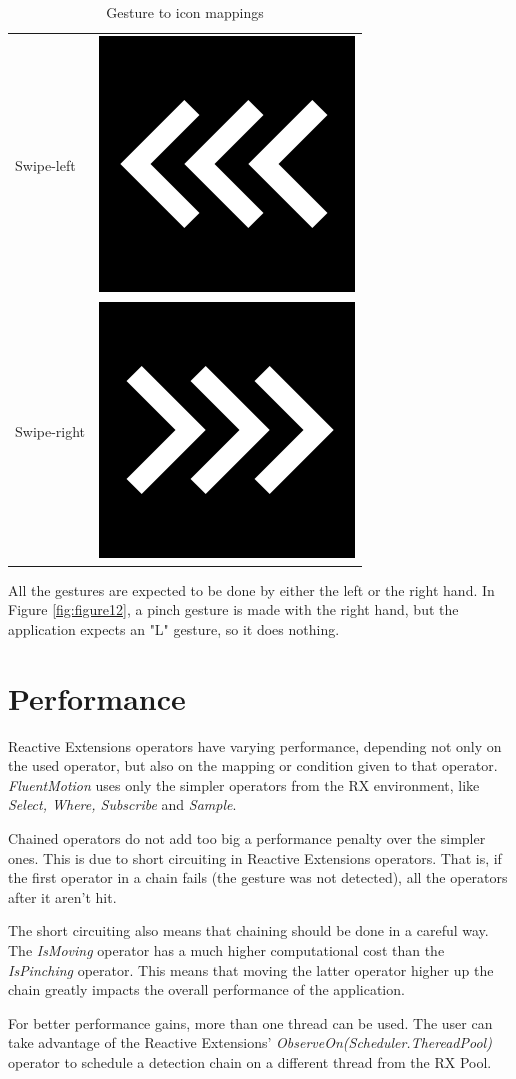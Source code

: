 \documentclass{sigchi}
\def\fluentmotion{\textit{FluentMotion}}
\def\rx{Reactive Extensions}
\begin{document}
\begin{table}[h]
\begin{tabular}{ m{5em} m{5em} }
    Swipe-left & \includegraphics[width=0.2\columnwidth]{figures/swipe-left.png} \\
    Swipe-right & \includegraphics[width=0.2\columnwidth]{figures/swipe-right.png} \\    
  \end{tabular}
  \caption{Gesture to icon mappings}
  \label{tab:table1}
\end{table}

All the gestures are expected to be done by either the left or the right hand. In Figure \ref{fig:figure12}, a pinch gesture is made with the right hand, but the application expects an "L" gesture, so it does nothing.

\section{Performance}

\rx{} operators have varying performance, depending not only on the used operator, but also on the mapping or condition given to that operator. \fluentmotion{} uses only the simpler operators from the RX environment, like \textit{Select, Where, Subscribe} and \textit{Sample}.


Chained operators do not add too big a performance penalty over the simpler ones. This is due to short circuiting in \rx{} operators. That is, if the first operator in a chain fails (the gesture was not detected), all the operators after it aren't hit.


The short circuiting also means that chaining should be done in a careful way. The \textit{IsMoving} operator has a much higher computational cost than the \textit{IsPinching} operator. This means that moving the latter operator higher up the chain greatly impacts the overall performance of the application.


For better performance gains, more than one thread can be used. The user can take advantage of the \rx{}' \textit{ObserveOn(Scheduler.ThereadPool)} operator to schedule a detection chain on a different thread from the RX Pool. 
\end{document}
